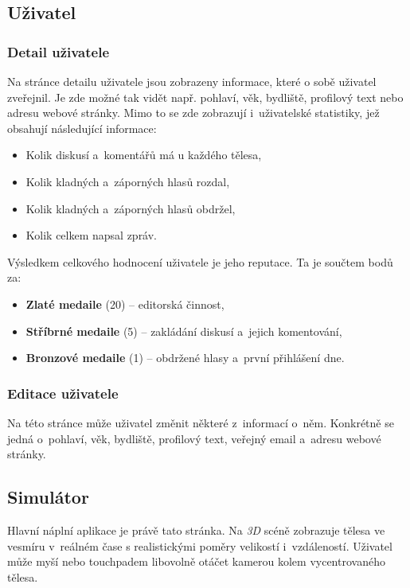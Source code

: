 \documentclass[a4paper,12pt]{article}
\begin{document}
\subsection{Uživatel}

\subsubsection{Detail uživatele}

Na stránce detailu uživatele jsou zobrazeny informace, které o sobě uživatel zveřejnil. Je zde možné tak vidět např. pohlaví, věk, bydliště, profilový text nebo adresu webové stránky. Mimo to se zde zobrazují i~uživatelské statistiky, jež obsahují následující informace:

\begin{itemize}
\item Kolik diskusí a~komentářů má u každého tělesa,
\item Kolik kladných a~záporných hlasů rozdal,
\item Kolik kladných a~záporných hlasů obdržel,
\item Kolik celkem napsal zpráv.
\end{itemize}

Výsledkem celkového hodnocení uživatele je jeho reputace. Ta je součtem bodů za:

\begin{itemize}
\item \textbf{Zlaté medaile} (20) -- editorská činnost,
\item \textbf{Stříbrné medaile} (5) -- zakládání diskusí a~jejich komentování,
\item \textbf{Bronzové medaile} (1) -- obdržené hlasy a~první přihlášení dne.
\end{itemize}

\subsubsection{Editace uživatele}

Na této stránce může uživatel změnit některé z~informací o~něm. Konkrétně se jedná o~pohlaví, věk, bydliště, profilový text, veřejný email a~adresu webové stránky.
	
\subsection{Simulátor}

Hlavní náplní aplikace je právě tato stránka. Na \textit{3D} scéně zobrazuje tělesa ve vesmíru v~reálném čase s realistickými poměry velikostí i~vzdáleností. Uživatel může myší nebo touchpadem libovolně otáčet kamerou kolem vycentrovaného tělesa.
\end{document}
